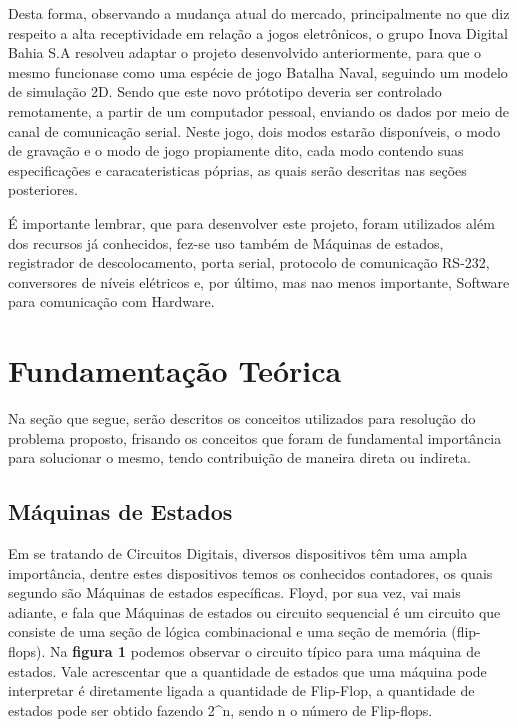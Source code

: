 \documentclass[12pt]{article}
\begin{document}
Desta forma, observando a mudança atual do mercado, principalmente no que diz respeito a alta receptividade em relação a jogos eletrônicos, o grupo Inova Digital Bahia S.A  resolveu adaptar o projeto desenvolvido anteriormente, para que o mesmo funcionase como uma espécie de jogo Batalha Naval, seguindo um modelo de simulação 2D. Sendo que este novo prótotipo deveria ser controlado remotamente, a partir de um computador pessoal, enviando os dados por meio de canal de comunicação serial. Neste jogo, dois modos estarão disponíveis, o modo de gravação e o modo de jogo propiamente dito, cada modo contendo suas especificações e caracateristicas póprias, as quais serão descritas nas seções posteriores.

É importante lembrar, que para desenvolver este projeto, foram utilizados além dos recursos já conhecidos, fez-se uso também de Máquinas de estados, registrador de descolocamento, porta serial, protocolo de comunicação RS-232, conversores de níveis elétricos e, por último, mas nao menos importante, Software para comunicação com Hardware.

\section{Fundamentação Teórica}

Na seção que segue, serão descritos os conceitos utilizados para resolução do problema proposto, frisando os conceitos que foram de fundamental importância para solucionar o mesmo, tendo contribuição de maneira direta ou indireta.

\subsection{Máquinas de Estados}

Em se tratando de Circuitos Digitais, diversos dispositivos têm uma ampla importância, dentre estes dispositivos temos os conhecidos contadores, os quais segundo\cite{tocci1997digital} são Máquinas de estados específicas. Floyd, por sua vez, vai mais adiante, e fala que Máquinas de estados ou circuito sequencial é um circuito que  consiste de uma seção de lógica combinacional e uma seção de memória (flip-flops)\cite{floyd2011digital}. Na \textbf{figura 1} podemos observar o circuito típico para uma máquina de estados. Vale acrescentar que a quantidade de estados que uma máquina pode interpretar é diretamente ligada a quantidade de Flip-Flop, a quantidade de estados pode ser obtido fazendo 2^n, sendo n o número de Flip-flops.  
\end{document}
